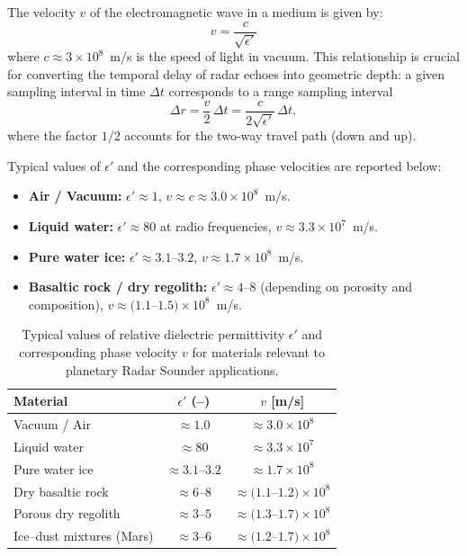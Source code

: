 The velocity $v$ of the electromagnetic wave in a medium is given by:
\begin{equation}
v = \frac{c}{\sqrt{\epsilon'}}
\end{equation}
where $c \approx 3 \times 10^8$~m/s is the speed of light in vacuum.
This relationship is crucial for converting the temporal delay of radar echoes into geometric depth: a given sampling interval in time $\Delta t$ corresponds to a range sampling interval
\begin{equation}
\Delta r = \frac{v}{2}\,\Delta t = \frac{c}{2\sqrt{\epsilon'}}\,\Delta t,
\end{equation}
where the factor $1/2$ accounts for the two-way travel path (down and up).

Typical values of $\epsilon'$ and the corresponding phase velocities are reported below:
\begin{itemize}
    \item \textbf{Air / Vacuum:} $\epsilon' \approx 1$, $v \approx c \approx 3.0 \times 10^8$~m/s.
    \item \textbf{Liquid water:} $\epsilon' \approx 80$ at radio frequencies, $v \approx 3.3 \times 10^7$~m/s.
    \item \textbf{Pure water ice:} $\epsilon' \approx 3.1$–$3.2$, $v \approx 1.7 \times 10^8$~m/s.
    \item \textbf{Basaltic rock / dry regolith:} $\epsilon' \approx 4$–$8$ (depending on porosity and composition), $v \approx (1.1$–$1.5) \times 10^8$~m/s.
\end{itemize}

\begin{table}[t]
    \centering
    \caption{Typical values of relative dielectric permittivity $\epsilon'$ and corresponding phase velocity $v$ for materials relevant to planetary Radar Sounder applications.}
    \label{tab:dielectric_constants}
    \begin{tabular}{lcc}
        \hline
        Material                & $\epsilon'$ (–) & $v$ [m/s] \\
        \hline
        Vacuum / Air            & $\approx 1.0$   & $\approx 3.0 \times 10^8$ \\
        Liquid water            & $\approx 80$    & $\approx 3.3 \times 10^7$ \\
        Pure water ice          & $\approx 3.1$–$3.2$ & $\approx 1.7 \times 10^8$ \\
        Dry basaltic rock       & $\approx 6$–$8$ & $\approx (1.1$–$1.2) \times 10^8$ \\
        Porous dry regolith     & $\approx 3$–$5$ & $\approx (1.3$–$1.7) \times 10^8$ \\
        Ice–dust mixtures (Mars)& $\approx 3$–$6$ & $\approx (1.2$–$1.7) \times 10^8$ \\
        \hline
    \end{tabular}
\end{table}

